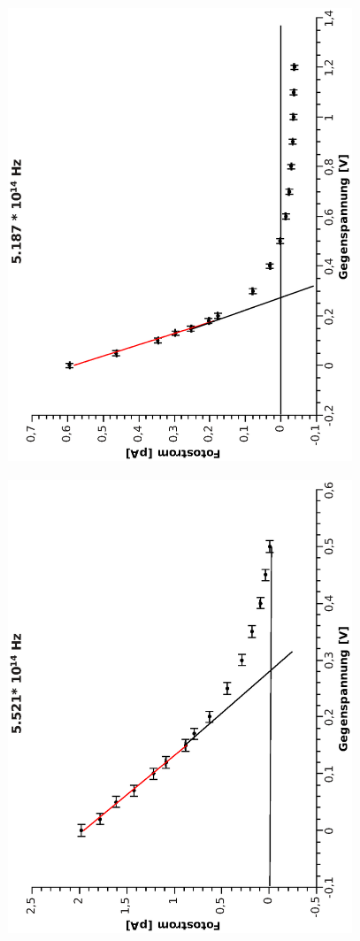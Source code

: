 \documentclass[12pt]{article}
\begin{document}
\begin{figure}
\centering
\begin{subfigure}{0.48\linewidth}
\includegraphics[width=0.75\linewidth, angle=-90]{5187.eps}
\end{subfigure}
\begin{subfigure}{0.48\linewidth}
\includegraphics[width=0.75\linewidth, angle=-90]{5521.eps}

\end{subfigure}
\end{figure}
\end{document}

